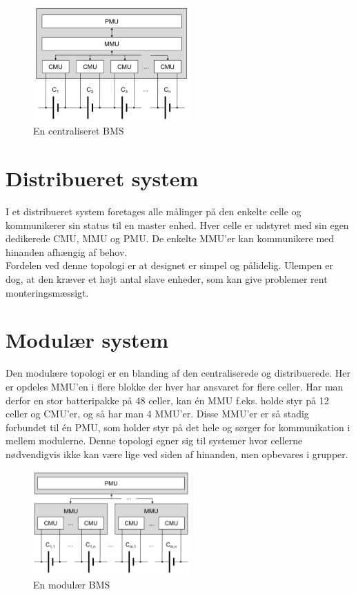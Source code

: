 \begin{figure}[h]
	\centering
	\includegraphics[width=6cm]{billeder/centralized.png}
	\caption{En centraliseret BMS}
	\label{fig:centralized_BMS}
\end{figure}

\section{Distribueret system}
I et distribueret system foretages alle målinger på den enkelte celle og kommunikerer sin status til en master enhed. Hver celle er udstyret med sin egen dedikerede CMU, MMU og PMU. De enkelte MMU'er kan kommunikere med hinanden afhængig af behov.
\\

Fordelen ved denne topologi er at designet er simpel og pålidelig. Ulempen er dog, at den kræver et højt antal slave enheder, som kan give problemer rent monteringsmæssigt.

\section{Modulær system}
Den modulære topologi er en blanding af den centraliserede og distribuerede. Her er opdeles MMU'en i flere blokke der hver har ansvaret for flere celler. Har man derfor en stor batteripakke på 48 celler, kan én MMU f.eks. holde styr på 12 celler og CMU'er, og så har man 4 MMU'er. Disse MMU'er er så stadig forbundet til én PMU, som holder styr på det hele og sørger for kommunikation i mellem modulerne. Denne topologi egner sig til systemer hvor cellerne nødvendigvis ikke kan være lige ved siden af hinanden, men opbevares i grupper. 

\begin{figure}[h]
	\centering
	\includegraphics[width=6cm]{billeder/modular.png}
	\caption{En modulær BMS}
	\label{fig:modular_BMS}
\end{figure}


